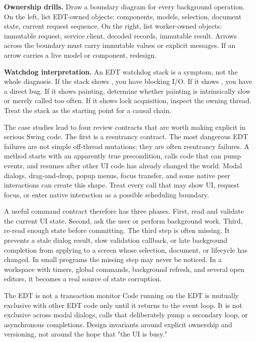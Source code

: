 \textbf{Ownership drills.} Draw a boundary diagram for every background operation. On the left, list EDT-owned objects: components, models, selection, document state, current request sequence. On the right, list worker-owned objects: immutable request, service client, decoded records, immutable result. Arrows across the boundary must carry immutable values or explicit messages. If an arrow carries a live model or component, redesign.

\textbf{Watchdog interpretation.} An EDT watchdog stack is a symptom, not the whole diagnosis. If the stack shows , you have blocking I/O. If it shows , you have a direct bug. If it shows painting, determine whether painting is intrinsically slow or merely called too often. If it shows lock acquisition, inspect the owning thread. Treat the stack as the starting point for a causal chain.

The case studies lead to four review contracts that are worth making explicit in serious Swing code. The first is a reentrancy contract. The most dangerous EDT failures are not simple off-thread mutations; they are often reentrancy failures. A method starts with an apparently true precondition, calls code that can pump events, and resumes after other UI code has already changed the world. Modal dialogs, drag-and-drop, popup menus, focus transfer, and some native peer interactions can create this shape. Treat every call that may show UI, request focus, or enter native interaction as a possible scheduling boundary.

A useful command contract therefore has three phases. First, read and validate the current UI state. Second, ask the user or perform background work. Third, re-read enough state before committing. The third step is often missing. It prevents a stale dialog result, slow validation callback, or late background completion from applying to a screen whose selection, document, or lifecycle has changed. In small programs the missing step may never be noticed. In a workspace with timers, global commands, background refresh, and several open editors, it becomes a real source of state corruption.

\begin{detailbox}{The EDT is not a transaction monitor}
Code running on the EDT is mutually exclusive with other EDT code only until it returns to the event loop. It is not exclusive across modal dialogs, calls that deliberately pump a secondary loop, or asynchronous completions. Design invariants around explicit ownership and versioning, not around the hope that "the UI is busy."
\end{detailbox}


